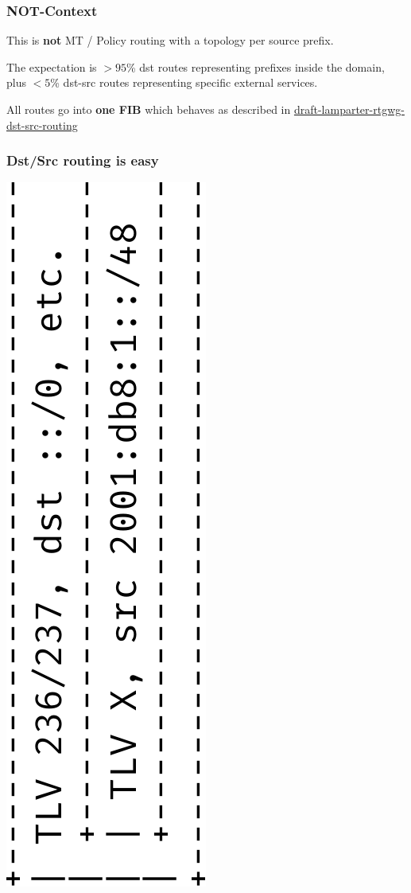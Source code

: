 \documentclass[12pt]{beamer}
\begin{document}
\begin{frame}
  \frametitle{NOT-Context}
  This is \textbf{not} MT / Policy routing with a topology per source prefix.

  The expectation is $>95$\% dst routes representing prefixes inside the
  domain, plus $<5$\% dst-src routes representing specific external services.

  All routes go into \textbf{one FIB} which behaves as described in
  \href{https://datatracker.ietf.org/doc/draft-lamparter-rtgwg-dst-src-routing/}{draft-lamparter-rtgwg-dst-src-routing}
\end{frame}

\begin{frame}
  \frametitle{Dst/Src routing is easy}
  \includegraphics[scale=0.45,angle=-90]{isis_dstsrc_tlv.pdf}%

\end{frame}
\end{document}
